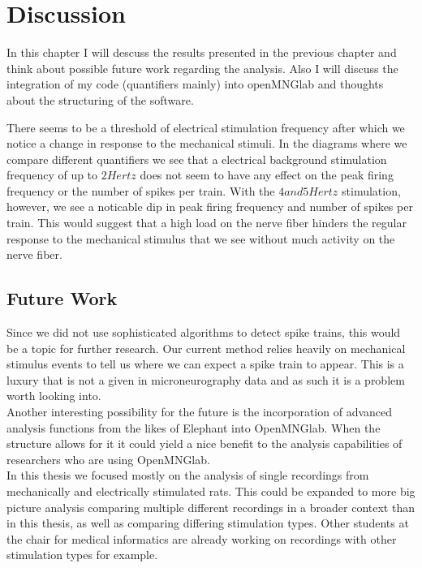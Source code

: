 \chapter{Discussion}

In this chapter I will descuss the results presented in the previous chapter and think about possible future work regarding the analysis. Also I will discuss the integration of my code (quantifiers mainly) into openMNGlab and thoughts about the structuring of the software.

There seems to be a threshold of electrical stimulation frequency after which we notice a change in response to the mechanical stimuli. In the diagrams where we compare different quantifiers we see that a electrical background stimulation frequency of up to $2 Hertz$ does not seem to have any effect on the peak firing frequency or the number of spikes per train. With the $4 and 5 Hertz$ stimulation, however, we see a noticable dip in peak firing frequency and number of spikes per train. This would suggest that a high load on the nerve fiber hinders the regular response to the mechanical stimulus that we see without much activity on the nerve fiber.

\section{Future Work}
Since we did not use sophisticated algorithms to detect spike trains, this would be a topic for further research. Our current method relies heavily on mechanical stimulus events to tell us where we can expect a spike train to appear. This is a luxury that is not a given in microneurography data and as such it is a problem worth looking into.\\
Another interesting possibility for the future is the incorporation of advanced analysis functions from the likes of Elephant into OpenMNGlab. When the structure allows for it it could yield a nice benefit to the analysis capabilities of researchers who are using OpenMNGlab.\\
In this thesis we focused mostly on the analysis of single recordings from mechanically and electrically stimulated rats. This could be expanded to more big picture analysis comparing multiple different recordings in a broader context than in this thesis, as well as comparing differing stimulation types. Other students at the chair for medical informatics are already working on recordings with other stimulation types for example.\\





\cleardoublepage
